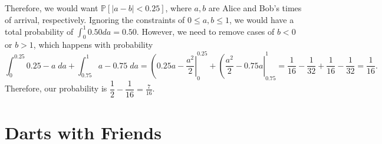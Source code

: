 \documentclass{article}
\newcommand{\p}{\mathbb{P}}
\begin{document}
Therefore, we would want $\p[|a-b| < 0.25]$, where $a, b$ are Alice and Bob's times of arrival, respectively. Ignoring the constraints of $0 \leq a,b \leq 1$, we would have a total probability of $\int_0^1 0.50 da = 0.50$. However, we need to remove cases of $b < 0$ or $b > 1$, which happens with probability $$\int_0^{0.25} 0.25-a \phantom{|} da + \int_{0.75}^{1} a-0.75 \phantom{|} da= \left(0.25a - \frac{a^2}{2}\right|^{0.25}_0 + \left(\frac{a^2}{2} - 0.75a\right|^{1}_{0.75} = \frac{1}{16} - \frac{1}{32} + \frac{1}{16} - \frac{1}{32} = \frac{1}{16}.$$ Therefore, our probability is $\dfrac{1}{2} - \dfrac{1}{16} = \boxed{\frac{7}{16}}$. 

\section{Darts with Friends}
\end{document}
